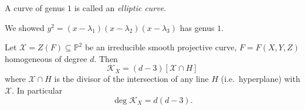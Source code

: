 \documentclass[a4paper]{article}
\renewcommand*{\P}{\mathbb{P}}
\begin{document}
\begin{definition}
  A curve of genus \(1\) is called an \emph{elliptic curve}.
\end{definition}
We showed \(y^2 = (x - \lambda_1)(x - \lambda_2)(x - \lambda_3)\) has genus \(1\).

\begin{proposition}
  Let \(\mathcal X = Z(F) \subseteq \P^2\) be an irreducible smooth projective curve, \(F = F(X, Y, Z)\) homogeneous of degree \(d\). Then
  \[
    \mathcal K_X = (d - 3) [\mathcal X \cap H]
  \]
  where \(\mathcal X \cap H\) is the divisor of the intersection of any line \(H\) (i.e.\ hyperplane) with \(\mathcal X\). In particular
  \[
    \deg \mathcal K_X = d(d - 3).
  \]
\end{proposition}
\end{document}
